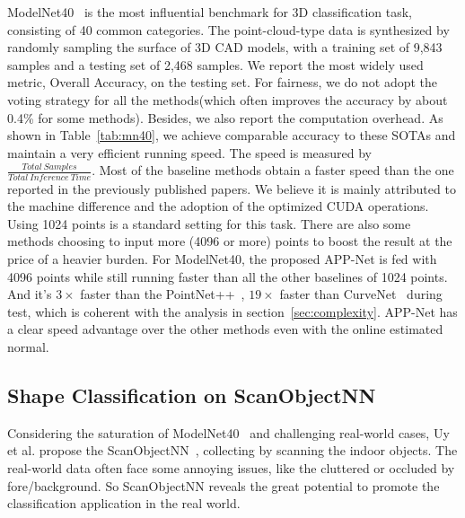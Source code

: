 \documentclass[journal]{IEEEtran}
\begin{document}
ModelNet40~\cite{wu20153d} is the most influential benchmark for 3D classification task, consisting of 40 common categories. The point-cloud-type data is synthesized by randomly sampling the surface of 3D CAD models, with a training set of 9,843 samples and a testing set of 2,468 samples. We report the most widely used metric, Overall Accuracy, on the testing set. For fairness, we do not adopt the voting strategy for all the methods(which often improves the accuracy by about 0.4\% for some methods). Besides, we also report the computation overhead. As shown in Table~\ref{tab:mn40}, we achieve comparable accuracy to these SOTAs and maintain a very efficient running speed. The speed is measured by $\frac{Total \ Samples}{Total\ Inference\ Time}$. Most of the baseline methods obtain a faster speed than the one reported in the previously published papers. We believe it is mainly attributed to the machine difference and the adoption of the optimized CUDA operations. Using 1024 points is a standard setting for this task. There are also some methods choosing to input more (4096 or more) points to boost the result at the price of a heavier burden. For ModelNet40, the proposed APP-Net is fed with 4096 points while still running faster than all the other baselines of 1024 points. And it's {\bf $3\times$} faster than the PointNet++~\cite{PointNet++}, {\bf $19\times$} faster than CurveNet~\cite{muzahid2020curvenet} during test, which is coherent with the analysis in section~\ref{sec:complexity}. APP-Net has a clear speed advantage over the other methods even with the online estimated normal. 


                                                                      

\subsection{Shape Classification on ScanObjectNN}



Considering the saturation of ModelNet40~\cite{wu20153d} and challenging real-world cases, Uy et al. propose the ScanObjectNN~\cite{uy2019revisiting}, collecting by scanning the indoor objects. The real-world data often face some annoying issues, like the cluttered or occluded by fore/background. So ScanObjectNN reveals the great potential to promote the classification application in the real world. 
\end{document}

